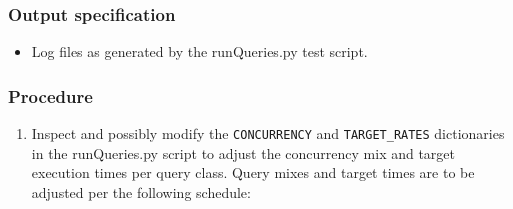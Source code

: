 \subsubsection{Output specification}

\begin{itemize}
  \item{Log files as generated by the runQueries.py test script.}
\end{itemize}

\subsubsection{Procedure}

\begin{enumerate}

  \item{Inspect and possibly modify the \texttt{CONCURRENCY} and \texttt{TARGET\_RATES} dictionaries in
  the runQueries.py script to adjust the concurrency mix and target execution times per query class.  Query 
  mixes and target times are to be adjusted per the following schedule:

}
\end{enumerate}
